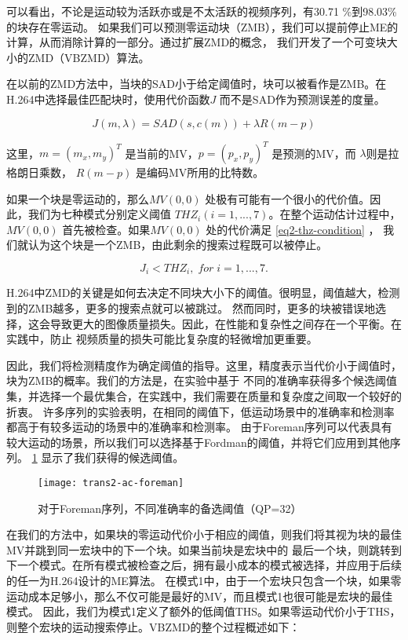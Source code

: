 可以看出，不论是运动较为活跃亦或是不太活跃的视频序列，有30.71 \%到98.03\%的块存在零运动。
如果我们可以预测零运动块（ZMB），我们可以提前停止ME的计算，从而消除计算的一部分。通过扩展ZMD的概念，
我们开发了一个可变块大小的ZMD（VBZMD）算法。

在以前的ZMD方法中，当块的SAD小于给定阈值时，块可以被看作是ZMB。在H.264中选择最佳匹配块时，使用代价函数$J$
而不是SAD作为预测误差的度量。

\begin{equation}
\label{eq2-cost}
J(m, \lambda) = SAD (s, c(m)) + \lambda R(m - p)
\end{equation}

这里，$m = (m_x, m_y)^T$ 是当前的MV，$p = (p_x, p_y)^T$ 是预测的MV，而 $ \lambda $则是拉格朗日乘数，
$ R(m - p) $ 是编码MV所用的比特数。

如果一个块是零运动的，那么$MV(0, 0)$ 处极有可能有一个很小的代价值。因此，我们为七种模式分别定义阈值 
$THZ_i(i=1,...,7)$。在整个运动估计过程中，$MV(0, 0)$ 首先被检查。如果$MV(0, 0)$ 处的代价满足 \ref{eq2-thz-condition} ，
我们就认为这个块是一个ZMB，由此剩余的搜索过程既可以被停止。

\begin{equation}
\label{eq2-thz-condition}
J_i < THZ_i, \; for \; i = 1,...,7.
\end{equation}

H.264中ZMD的关键是如何去决定不同块大小下的阈值。很明显，阈值越大，检测到的ZMB越多，更多的搜索点就可以被跳过。
然而同时，更多的块被错误地选择，这会导致更大的图像质量损失。因此，在性能和复杂性之间存在一个平衡。在实践中，防止
视频质量的损失可能比复杂度的轻微增加更重要。

因此，我们将检测精度作为确定阈值的指导。这里，精度表示当代价小于阈值时，块为ZMB的概率。我们的方法是，在实验中基于
不同的准确率获得多个候选阈值集，并选择一个最优集合，在实践中，我们需要在质量和复杂度之间取一个较好的折衷。
许多序列的实验表明，在相同的阈值下，低运动场景中的准确率和检测率都高于有较多运动的场景中的准确率和检测率。
由于Foreman序列可以代表具有较大运动的场景，所以我们可以选择基于Fordman的阈值，并将它们应用到其他序列。 
\ref{fig:trans2-ac-foreman} 显示了我们获得的候选阈值。

\begin{figure}[H] %
  \centering
  \texttt{[image: trans2-ac-foreman]}
  \caption{对于Foreman序列，不同准确率的备选阈值（QP=32）}
  \label{fig:trans2-ac-foreman}
\end{figure}

在我们的方法中，如果块的零运动代价小于相应的阈值，则我们将其视为块的最佳MV并跳到同一宏块中的下一个块。如果当前块是宏块中的
最后一个块，则跳转到下一个模式。在所有模式被检查之后，拥有最小成本的模式被选择，并应用于后续的任一为H.264设计的ME算法。
在模式1中，由于一个宏块只包含一个块，如果零运动成本足够小，那么不仅可能是最好的MV，而且模式1也很可能是宏块的最佳模式。
因此，我们为模式1定义了额外的低阈值THS。如果零运动代价小于THS，则整个宏块的运动搜索停止。VBZMD的整个过程概述如下：

